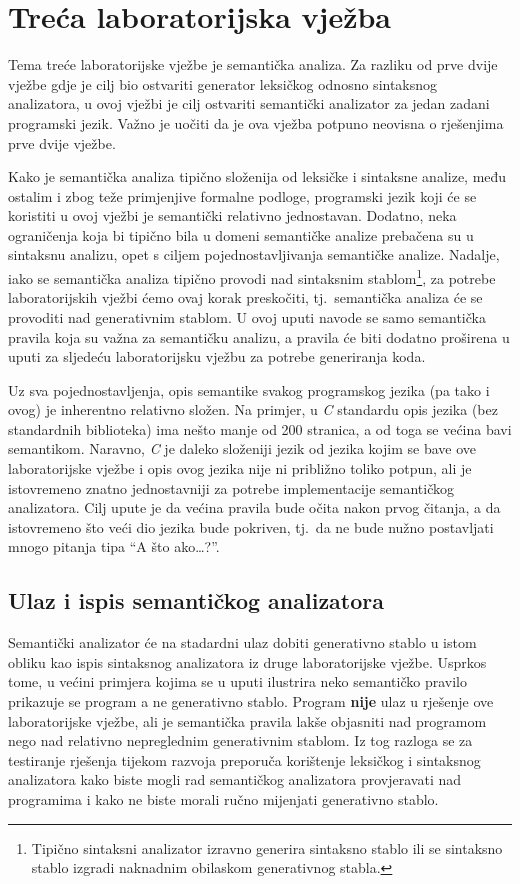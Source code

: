 \documentclass[times, 12pt, utf8]{book}
\begin{document}
\chapter{Treća laboratorijska vježba}\label{chap:III}
Tema treće laboratorijske vježbe je semantička analiza.
Za razliku od prve dvije vježbe gdje je cilj bio ostvariti generator leksičkog odnosno sintaksnog analizatora, u ovoj vježbi je cilj ostvariti semantički analizator za jedan zadani programski jezik.
Važno je uočiti da je ova vježba potpuno neovisna o rješenjima prve dvije vježbe.

Kako je semantička analiza tipično složenija od leksičke i sintaksne analize, među ostalim i zbog teže primjenjive formalne podloge, programski jezik koji će se koristiti u ovoj vježbi je semantički relativno jednostavan.
Dodatno, neka ograničenja koja bi tipično bila u domeni semantičke analize prebačena su u sintaksnu analizu, opet s ciljem pojednostavljivanja semantičke analize.
Nadalje, iako se semantička analiza tipično provodi nad sintaksnim stablom\footnote{Tipično sintaksni analizator izravno generira sintaksno stablo ili se sintaksno stablo izgradi naknadnim obilaskom generativnog stabla.}, za potrebe laboratorijskih vježbi ćemo ovaj korak preskočiti, tj.~semantička analiza će se provoditi nad generativnim stablom.
U ovoj uputi navode se samo semantička pravila koja su važna za semantičku analizu, a pravila će biti dodatno proširena u uputi za sljedeću laboratorijsku vježbu za potrebe generiranja koda.

Uz sva pojednostavljenja, opis semantike svakog programskog jezika (pa tako i ovog) je inherentno relativno složen.
Na primjer, u \emph{C} standardu opis jezika (bez standardnih biblioteka) ima nešto manje od 200 stranica, a od toga se većina bavi semantikom.
Naravno, \emph{C} je daleko složeniji jezik od jezika kojim se bave ove laboratorijske vježbe i opis ovog jezika nije ni približno toliko potpun, ali je istovremeno znatno jednostavniji za potrebe implementacije semantičkog analizatora.
Cilj upute je da većina pravila bude očita nakon prvog čitanja, a da istovremeno što veći dio jezika bude pokriven, tj.~da ne bude nužno postavljati mnogo pitanja tipa ``A što ako\ldots?''.

\section{Ulaz i ispis semantičkog analizatora}
Semantički analizator će na stadardni ulaz dobiti generativno stablo u istom obliku kao ispis sintaksnog analizatora iz druge laboratorijske vježbe.
Usprkos tome, u većini primjera kojima se u uputi ilustrira neko semantičko pravilo prikazuje se program a ne generativno stablo.
Program \textbf{nije} ulaz u rješenje ove laboratorijske vježbe, ali je semantička pravila lakše objasniti nad programom nego nad relativno nepreglednim generativnim stablom.
Iz tog razloga se za testiranje rješenja tijekom razvoja preporuča korištenje leksičkog i sintaksnog analizatora kako biste mogli rad semantičkog analizatora provjeravati nad programima i kako ne biste morali ručno mijenjati generativno stablo.
\end{document}
